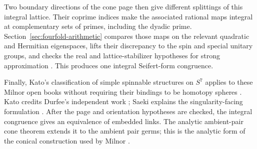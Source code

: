 Two boundary directions of the cone page then give different
splittings of this integral lattice. Their coprime indices make
the associated rational maps integral at complementary sets of
primes, including the dyadic prime. Section~\ref{sec:fourfold-arithmetic}
compares those maps on the relevant quadratic and Hermitian
eigenspaces, lifts their discrepancy to the spin and special
unitary groups, and checks the real and lattice-stabilizer hypotheses
for strong approximation
\cite{Platonov1969,Platonov1970}
\cite[Theorem~2.3]{Rapinchuk2014}. This produces one integral
Seifert-form congruence.

Finally, Kato's classification of simple spinnable structures on
\(S^7\) applies to these Milnor open books without requiring their
bindings to be homotopy spheres \cite[Theorem~B]{Kato1974}.
Kato credits Durfee's independent work \cite{Durfee1974};
Saeki explains the singularity-facing formulation
\cite[Definition~2.1 and pp.~698--699]{Saeki1999}. After the page and
orientation hypotheses are checked, the integral congruence gives
an equivalence of embedded links. The analytic ambient-pair cone theorem
\cite[Theorem~1.4]{Massey2015LeCycles} extends it to the ambient pair
germs; this is the analytic form of the conical construction used by
Milnor \cite[Section~2]{Milnor1968}.
